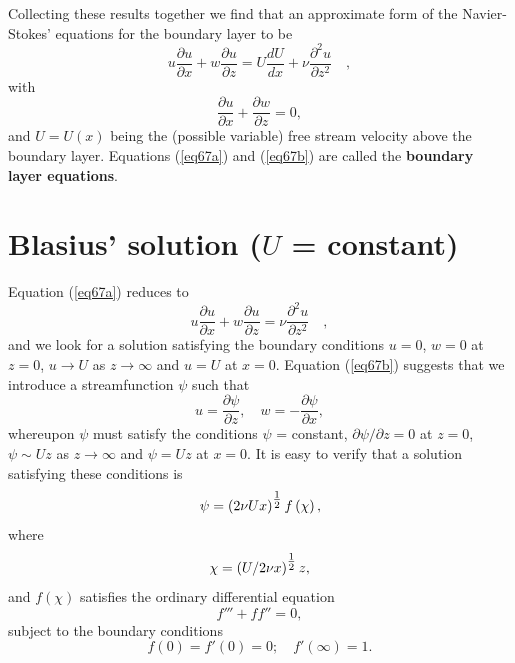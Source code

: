 \documentclass[10pt]{report}
\begin{document}
Collecting these results together we find that an approximate form of the
Navier-Stokes' equations for the boundary layer to be
\begin{equation}
\label{eq67a}
u\frac{\partial u}{\partial x}+w\frac{\partial u}{\partial
z}=U\frac{dU}{dx}+\nu \frac{\partial ^2u}{\partial z^2}\quad ,
\end{equation}
with
\begin{equation}
 \frac{\partial u}{\partial x}+\frac{\partial w}{\partial z}=0, \label{eq67b}
\end{equation}
and $U = U(x)$ being the (possible variable) free stream velocity above the
boundary layer. Equations (\ref{eq67a}) and (\ref{eq67b}) are called the \textbf{boundary
layer equations}.

\section{Blasius' solution ($U$ = constant)}
Equation (\ref{eq67a}) reduces to
\begin{equation}
\label{eq68}
u\frac{\partial u}{\partial x}+w\frac{\partial u}{\partial z}=\nu
\frac{\partial ^2u}{\partial z^2}\quad ,
\end{equation}
and we look for a solution satisfying the boundary conditions $u = 0$, $w = 0$
at $z = 0$, $u \to  U$ as $z \to \infty $ and $u = U$ at $x = 0$. Equation (\ref{eq67b})
suggests that we introduce a streamfunction $\psi $ such that
\[ u=\frac{\partial \psi }{\partial z}, \quad w=-\frac{\partial \psi }{\partial
x}, \]
whereupon $\psi $ must satisfy the conditions $\psi $ = constant, $\partial
\psi /\partial z = 0$ at $z = 0$, $\psi  \sim  Uz$ as $z \to \infty $
and $\psi  = Uz$ at $x = 0$. It is easy to verify that a solution satisfying
these conditions is
\begin{equation}
\label{eq69}
\psi =\left( {2\nu Ux} \right)^{\textstyle{1 \over 2}}f\left( \chi \right),
\end{equation}
where
\begin{equation}
\label{eq610}
\chi =\left( {U/ {2\nu x}} \right)^{\textstyle{1 \over 2}}z,
\end{equation}
and $f(\chi )$ satisfies the ordinary differential equation
\begin{equation}
\label{eq611}
{f}'''+f{f}''=0,
\end{equation}
subject to the boundary conditions
\begin{equation}
f(0) = f'(0) = 0; \quad f'(\infty ) = 1 . \label{eq613} \end{equation}
\end{document}
